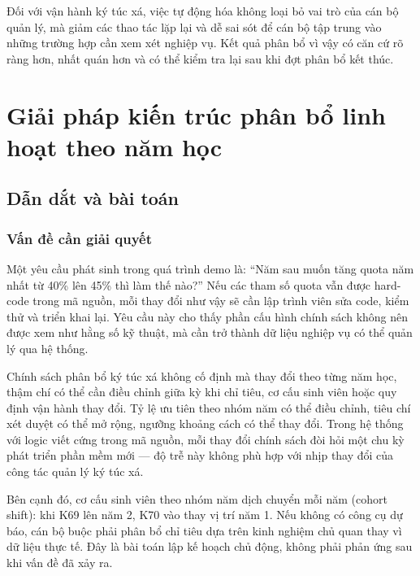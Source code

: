 \documentclass[../DoAn.tex]{subfiles}
\begin{document}
Đối với vận hành ký túc xá, việc tự động hóa không loại bỏ vai trò của cán bộ
quản lý, mà giảm các thao tác lặp lại và dễ sai sót để cán bộ tập trung vào
những trường hợp cần xem xét nghiệp vụ. Kết quả phân bổ vì vậy có căn cứ rõ
ràng hơn, nhất quán hơn và có thể kiểm tra lại sau khi đợt phân bổ kết thúc.

\section{Giải pháp kiến trúc phân bổ linh hoạt theo năm học}
\label{sec:contrib_policy}

\subsection{Dẫn dắt và bài toán}
\label{subsec:policy_problem}

\subsubsection{Vấn đề cần giải quyết}

Một yêu cầu phát sinh trong quá trình demo là: ``Năm sau muốn tăng quota năm
nhất từ 40\% lên 45\% thì làm thế nào?'' Nếu các tham số quota vẫn được
hard-code trong mã nguồn, mỗi thay đổi như vậy sẽ cần lập trình viên sửa code,
kiểm thử và triển khai lại. Yêu cầu này cho thấy phần cấu hình chính sách
không nên được xem như hằng số kỹ thuật, mà cần trở thành dữ liệu nghiệp vụ có
thể quản lý qua hệ thống.

Chính sách phân bổ ký túc xá không cố định mà thay đổi theo từng năm học, thậm
chí có thể cần điều chỉnh giữa kỳ khi chỉ tiêu, cơ cấu sinh viên hoặc quy định
vận hành thay đổi. Tỷ lệ ưu tiên theo nhóm năm có thể điều chỉnh, tiêu chí xét
duyệt có thể mở rộng, ngưỡng khoảng cách có thể thay đổi. Trong hệ thống với
logic viết cứng trong mã nguồn, mỗi thay đổi chính sách đòi hỏi một chu kỳ
phát triển phần mềm mới --- độ trễ này không phù hợp với nhịp thay đổi của
công tác quản lý ký túc xá.

Bên cạnh đó, cơ cấu sinh viên theo nhóm năm dịch chuyển mỗi năm (cohort
shift): khi K69 lên năm 2, K70 vào thay vị trí năm 1. Nếu không có công cụ
dự báo, cán bộ buộc phải phân bổ chỉ tiêu dựa trên kinh nghiệm chủ quan thay
vì dữ liệu thực tế. Đây là bài toán lập kế hoạch chủ động, không phải phản
ứng sau khi vấn đề đã xảy ra.
\end{document}
